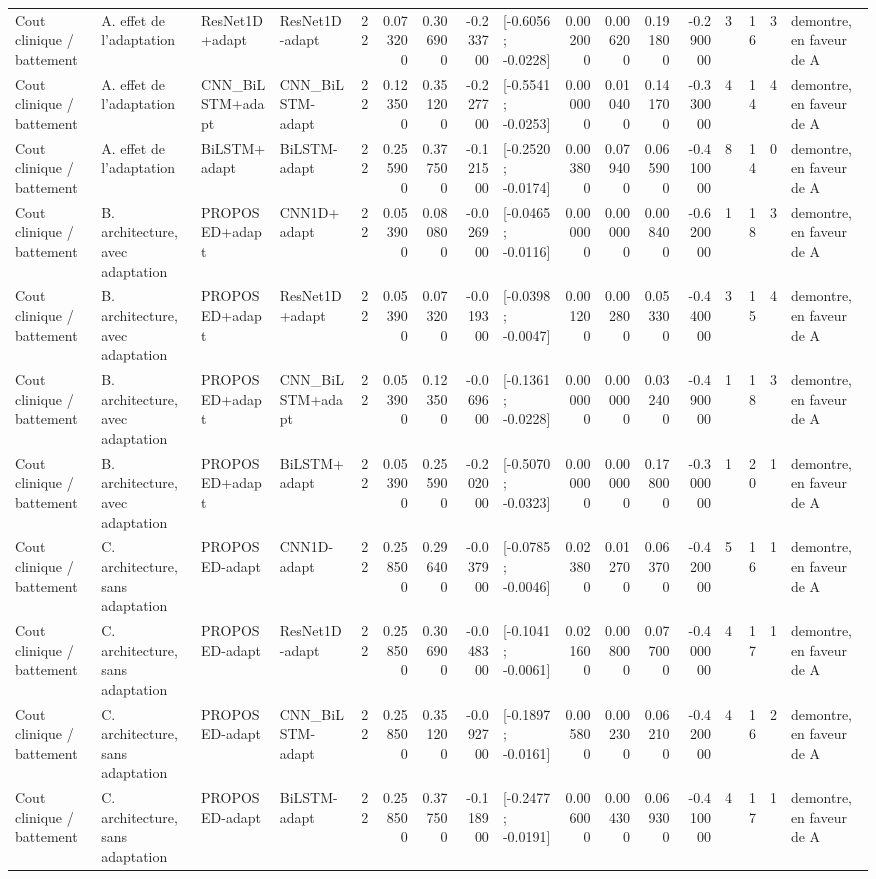 \begin{tabular}{llllrrrrlrrrrrrrl}
Cout clinique / battement & A. effet de l'adaptation & ResNet1D+adapt & ResNet1D-adapt & 22 & 0.073200 & 0.306900 & -0.233700 & [-0.6056 ; -0.0228] & 0.002000 & 0.006200 & 0.191800 & -0.290000 & 3 & 16 & 3 & demontre, en faveur de A \\
Cout clinique / battement & A. effet de l'adaptation & CNN_BiLSTM+adapt & CNN_BiLSTM-adapt & 22 & 0.123500 & 0.351200 & -0.227700 & [-0.5541 ; -0.0253] & 0.000000 & 0.010400 & 0.141700 & -0.330000 & 4 & 14 & 4 & demontre, en faveur de A \\
Cout clinique / battement & A. effet de l'adaptation & BiLSTM+adapt & BiLSTM-adapt & 22 & 0.255900 & 0.377500 & -0.121500 & [-0.2520 ; -0.0174] & 0.003800 & 0.079400 & 0.065900 & -0.410000 & 8 & 14 & 0 & demontre, en faveur de A \\
Cout clinique / battement & B. architecture, avec adaptation & PROPOSED+adapt & CNN1D+adapt & 22 & 0.053900 & 0.080800 & -0.026900 & [-0.0465 ; -0.0116] & 0.000000 & 0.000000 & 0.008400 & -0.620000 & 1 & 18 & 3 & demontre, en faveur de A \\
Cout clinique / battement & B. architecture, avec adaptation & PROPOSED+adapt & ResNet1D+adapt & 22 & 0.053900 & 0.073200 & -0.019300 & [-0.0398 ; -0.0047] & 0.001200 & 0.002800 & 0.053300 & -0.440000 & 3 & 15 & 4 & demontre, en faveur de A \\
Cout clinique / battement & B. architecture, avec adaptation & PROPOSED+adapt & CNN_BiLSTM+adapt & 22 & 0.053900 & 0.123500 & -0.069600 & [-0.1361 ; -0.0228] & 0.000000 & 0.000000 & 0.032400 & -0.490000 & 1 & 18 & 3 & demontre, en faveur de A \\
Cout clinique / battement & B. architecture, avec adaptation & PROPOSED+adapt & BiLSTM+adapt & 22 & 0.053900 & 0.255900 & -0.202000 & [-0.5070 ; -0.0323] & 0.000000 & 0.000000 & 0.178000 & -0.300000 & 1 & 20 & 1 & demontre, en faveur de A \\
Cout clinique / battement & C. architecture, sans adaptation & PROPOSED-adapt & CNN1D-adapt & 22 & 0.258500 & 0.296400 & -0.037900 & [-0.0785 ; -0.0046] & 0.023800 & 0.012700 & 0.063700 & -0.420000 & 5 & 16 & 1 & demontre, en faveur de A \\
Cout clinique / battement & C. architecture, sans adaptation & PROPOSED-adapt & ResNet1D-adapt & 22 & 0.258500 & 0.306900 & -0.048300 & [-0.1041 ; -0.0061] & 0.021600 & 0.008000 & 0.077000 & -0.400000 & 4 & 17 & 1 & demontre, en faveur de A \\
Cout clinique / battement & C. architecture, sans adaptation & PROPOSED-adapt & CNN_BiLSTM-adapt & 22 & 0.258500 & 0.351200 & -0.092700 & [-0.1897 ; -0.0161] & 0.005800 & 0.002300 & 0.062100 & -0.420000 & 4 & 16 & 2 & demontre, en faveur de A \\
Cout clinique / battement & C. architecture, sans adaptation & PROPOSED-adapt & BiLSTM-adapt & 22 & 0.258500 & 0.377500 & -0.118900 & [-0.2477 ; -0.0191] & 0.006000 & 0.004300 & 0.069300 & -0.410000 & 4 & 17 & 1 & demontre, en faveur de A \\
\bottomrule
\end{tabular}
